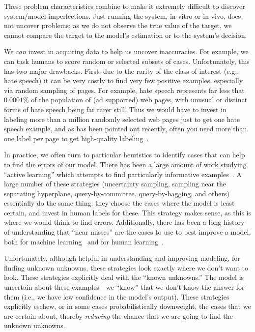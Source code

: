 These problem characteristics combine to make it extremely difficult to
discover system/model imperfections.  Just running the system, in
vitro or in vivo, does not uncover problems; as we do not observe
the true value of the target, we cannot compare the target to the model's
estimation or to the system's decision.

We \textit{can} invest in acquiring data to help us uncover inaccuracies.  For example, we can task humans to score random or selected subsets of cases.  Unfortunately, this has two major drawbacks.  First, due to the rarity of the class of interest (e.g., hate speech) it can be very costly to find very few positive examples, especially via random sampling of pages.  For example, hate speech represents far less that $0.0001\%$ of the population of (ad supported) web pages, with unusual or distinct forms of hate speech being far rarer still. Thus we would have to invest in labeling more than a million randomly selected web pages just to get one hate speech example, and as has been pointed out recently, often you need more than one label per page to get high-quality labeling~\cite{shengKDD2008,raykar2009supervised}.




In practice, we often turn to particular heuristics to identify
cases that can help to find the errors of our model.  There has been a
large amount of work studying ``active learning'' which attempts to
find particularly informative examples~\cite{SettlesActiveLearning}.
A large number of these strategies (uncertainty sampling, sampling
near the separating hyperplane, query-by-committee, query-by-bagging,
and others) essentially do the same thing: they choose the cases where
the model is least certain, and invest in human labels for these.
This strategy makes sense, as this is where we would think to find
errors.  Additionally, there has been a long history of understanding that
``near misses'' are the cases to use to best improve a model, both for
machine learning~\cite{winston1970learning} and for human
learning~\cite{vanlehn1998analogy}.

Unfortunately, although helpful in understanding and improving
modeling, for finding unknown unknowns, 
these strategies look exactly where we don't want to look.
These strategies explicitly deal with the ``known unknowns.''  The
model is uncertain about these examples---we ``know'' that we don't
know the answer for them (i.e., we have low confidence in the model's
output).  These strategies explicitly eschew, or in some cases
probabilistically downweight, the cases that we are
certain about, thereby \textit{reducing} the chance that we are going
to find the unknown unknowns.

